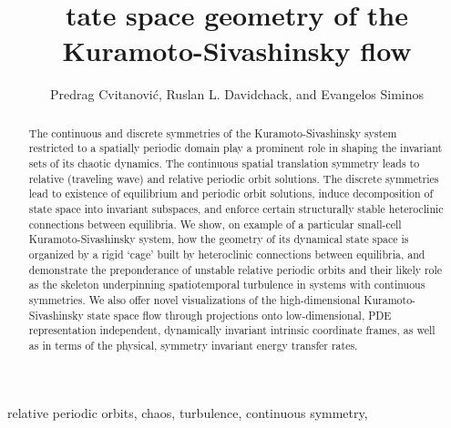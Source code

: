 \documentclass{siamltex}          %
\begin{document}
                \title{
tate space geometry of the
Kuramoto-Sivashinsky flow 
                 }
                  \author{
Predrag Cvitanovi\'c\footnotemark[1],
Ruslan L. Davidchack\footnotemark[2],
    and
Evangelos Siminos\footnotemark[1]
                    }

                \maketitle

\renewcommand{\thefootnote}{\fnsymbol{footnote}}
\renewcommand{\thefootnote}{\arabic{footnote}}

                \begin{abstract}
The continuous and discrete symmetries of the
Kuramoto-Sivashinsky system restricted to a spatially
periodic domain play a prominent role in shaping the
invariant sets of its chaotic dynamics. The continuous
spatial translation symmetry leads to relative
 (traveling wave) and relative periodic
orbit  solutions. The
discrete symmetries lead to existence of {equilibrium} and
periodic orbit solutions, induce decomposition of state space
into invariant subspaces, and enforce certain structurally
stable heteroclinic connections between equilibria. We show,
on example of a particular small-cell Kuramoto-Sivashinsky
system, how the geometry of its dynamical state space is
organized by a rigid `cage' built by heteroclinic connections
between equilibria, and demonstrate the preponderance of
unstable relative periodic orbits and their likely role as
the skeleton underpinning spatiotemporal turbulence in
systems with continuous symmetries. We also offer novel
visualizations of the high-dimensional Kuramoto-Sivashinsky
state space flow through projections onto low-dimensional,
PDE representation independent, dynamically invariant
intrinsic coordinate frames, as well as in terms of the
physical, symmetry invariant energy transfer rates.
                \end{abstract}

\begin{keywords}
relative periodic orbits, chaos, turbulence, continuous symmetry, {\KSe}
\end{keywords}
\end{document}
